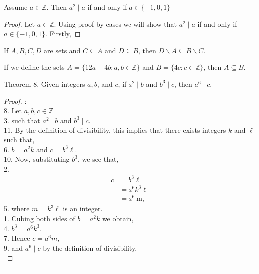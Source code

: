 \documentclass[12pt]{article}
\newenvironment{theorem}[2][Theorem]{\begin{trivlist}
\item[\hskip \labelsep {\bfseries #1}\hskip \labelsep {\bfseries #2.}]}{\end{trivlist}}
\begin{document}
\pagebreak

\begin{theorem}{5}
	Assume $a \in \mathbb{Z}$. Then $a^2 \mid a$ if and only if $a \in\{-1,0,1\}$
\end{theorem}
\begin{proof}
	Let $a \in \mathbb{Z}$. Using proof by cases we will show that $a^2 \mid a$ if and only if $a \in\{-1,0,1\}$.
	Firstly, 
\end{proof}
\begin{theorem}{6}
If $A, B, C, D$ are sets and $C \subseteq A$ and $D \subseteq B$, then $D \backslash A \subseteq B \backslash C$.
\end{theorem}
\begin{theorem}{7}
If we define the sets $A=\{12 a+4 b: a, b \in \mathbb{Z}\}$ and $B=\{4 c: c \in \mathbb{Z}\}$, then $A \subseteq B$.
\end{theorem}

\pagebreak

\begin{theorem}{8}
Theorem 8. Given integers $a, b$, and $c$, if $a^2 \mid b$ and $b^3 \mid c$, then $a^6 \mid c$.
\end{theorem}
\begin{proof}:\\
8. Let $a, b, c \in \mathbb{Z}$\\
3. such that $a^2 \mid b$ and $b^3 \mid c$.\\
11. By the definition of divisibility, this implies that there exists integers $k$ and $\ell$ such that,\\
6. $b=a^2 k$ and $c=b^3 \ell$.\\
10. Now, substituting $b^3$, we see that,\\
2.
$$
\begin{aligned}
c & =b^3 \ell \\
& =a^6 k^3 \ell \\
& =a^6 \mathrm{~m},
\end{aligned}
$$
5. where $m=k^3 \ell$ is an integer.\\
1. Cubing both sides of $b=a^2 k$ we obtain,\\
4. $b^3=a^6 k^3$.\\
7. Hence $c=a^6 m$,\\
9. and $a^6 \mid c$ by the definition of divisibility.\\
    
\end{proof}

\hrule
 
\end{document}
